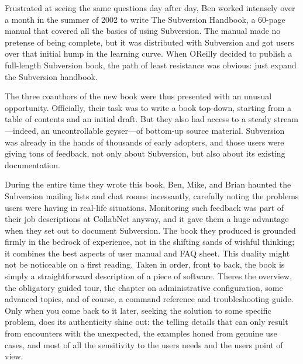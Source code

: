 Frustrated at seeing the same questions day after day, Ben worked
intensely over a month in the summer of 2002 to write The Subversion
Handbook, a 60-page manual that covered all the basics of using
Subversion. The manual made no pretense of being complete, but it was
distributed with Subversion and got users over that initial hump in the
learning curve. When O\textquotesingle Reilly decided to publish a
full-length Subversion book, the path of least resistance was obvious:
just expand the Subversion handbook.

The three coauthors of the new book were thus presented with an unusual
opportunity. Officially, their task was to write a book top-down,
starting from a table of contents and an initial draft. But they also
had access to a steady stream---indeed, an uncontrollable geyser---of
bottom-up source material. Subversion was already in the hands of
thousands of early adopters, and those users were giving tons of
feedback, not only about Subversion, but also about its existing
documentation.

During the entire time they wrote this book, Ben, Mike, and Brian
haunted the Subversion mailing lists and chat rooms incessantly,
carefully noting the problems users were having in real-life situations.
Monitoring such feedback was part of their job descriptions at CollabNet
anyway, and it gave them a huge advantage when they set out to document
Subversion. The book they produced is grounded firmly in the bedrock of
experience, not in the shifting sands of wishful thinking; it combines
the best aspects of user manual and FAQ sheet. This duality might not be
noticeable on a first reading. Taken in order, front to back, the book
is simply a straightforward description of a piece of software.
There\textquotesingle s the overview, the obligatory guided tour, the
chapter on administrative configuration, some advanced topics, and of
course, a command reference and troubleshooting guide. Only when you
come back to it later, seeking the solution to some specific problem,
does its authenticity shine out: the telling details that can only
result from encounters with the unexpected, the examples honed from
genuine use cases, and most of all the sensitivity to the
user\textquotesingle s needs and the user\textquotesingle s point of
view.

